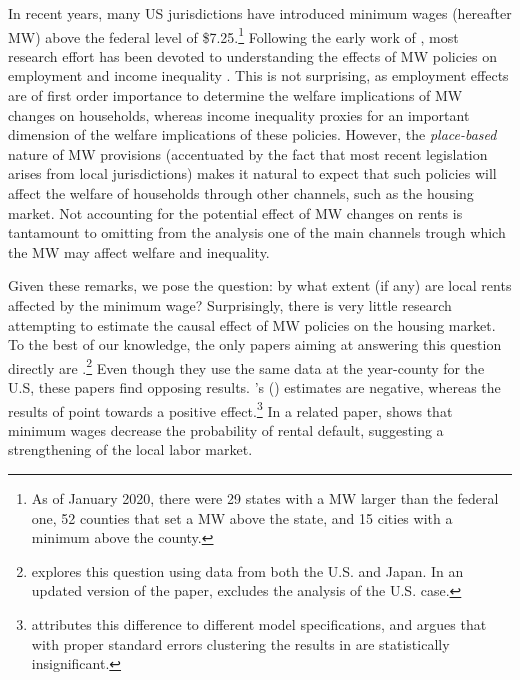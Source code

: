 
In recent years, many US jurisdictions have introduced minimum wages (hereafter MW) above the 
federal level of \$7.25.\footnote{As of January 2020, there were 29 states with a MW larger 
	than the federal one, 52 counties that set a MW above the state, and 15 cities with a 
	minimum above the county.}
Following the early work of \textcite{CardKrueger2000}, most research effort has been devoted 
to understanding the effects of MW policies on employment \parencite[e.g.,][]{Neumark2006, 
DubeEtAl2010, MeerWest2016, CegnizEtAl2019} and income inequality \parencite{Lee1999, 
AutorEtAl2016}. This is not surprising, as employment effects are of first order importance 
to determine the welfare implications of MW changes on households, whereas income inequality 
proxies for an important dimension of the welfare implications of these policies. However, the 
\textit{place-based} nature of MW provisions (accentuated by the fact that most recent 
legislation arises from local jurisdictions) makes it natural to expect that such policies 
will affect the welfare of households through other channels, such as the housing market. 
Not accounting for the potential effect of MW changes on rents is tantamount to omitting 
from the analysis one of the main channels trough which the MW may affect welfare and inequality.

Given these remarks, we pose the question: by what extent (if any) are local rents affected 
by the minimum wage? Surprisingly, there is very little research attempting to estimate 
the causal effect of MW policies on the housing market. To the best of our knowledge, the 
only papers aiming at answering this question directly are \textcite{Tidemann2018, Yamagishi2019, 
Yamagishi2020}.\footnote{\textcite{Yamagishi2019} explores this question using data from both 
	the U.S. and Japan. In an updated version of the paper, \textcite{Yamagishi2020} excludes 
	the analysis of the U.S. case.} 
Even though they use the same data at the year-county for the U.S, these papers find opposing 
results. \citeauthor{Tidemann2018}'s (\citeyear{Tidemann2018}) estimates are negative, whereas 
the results of \textcite{Yamagishi2019} point towards a positive effect.\footnote{
	\textcite{Yamagishi2019} attributes this difference to different model 
	specifications, and argues that with proper standard errors clustering the results in 
	\textcite{Tidemann2018} are statistically insignificant.} 
In a related paper, \textcite{AgarwalEtAl2019} shows that minimum wages decrease 
the probability of rental default, suggesting a strengthening of the local labor market.

